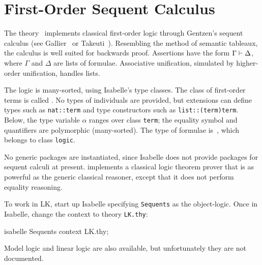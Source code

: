 \chapter{First-Order Sequent Calculus}

The theory~ implements classical first-order logic through
Gentzen's sequent calculus (see Gallier~\cite{gallier86} or
Takeuti~\cite{takeuti87}).  Resembling the method of semantic tableaux, the
calculus is well suited for backwards proof.  Assertions have the form
\(\Gamma\vdash \Delta\), where \(\Gamma\) and \(\Delta\) are lists of
formulae.  Associative unification, simulated by higher-order unification,
handles lists.

The logic is many-sorted, using Isabelle's type classes.  The class of
first-order terms is called .  No types of individuals are
provided, but extensions can define types such as {\tt nat::term} and type
constructors such as {\tt list::(term)term}.  Below, the type variable
$\alpha$ ranges over class {\tt term}; the equality symbol and quantifiers
are polymorphic (many-sorted).  The type of formulae is~, which
belongs to class {\tt logic}.

No generic packages are instantiated, since Isabelle does not provide
packages for sequent calculi at present.  \LK{} implements a classical
logic theorem prover that is as powerful as the generic classical reasoner,
except that it does not perform equality reasoning.

To work in LK, start up Isabelle specifying  \texttt{Sequents} as the
object-logic.  Once in Isabelle, change the context to theory \texttt{LK.thy}:
\begin{ttbox}
isabelle Sequents
context LK.thy;
\end{ttbox}
Model logic and linear logic are also available, but unfortunately they are
not documented.


